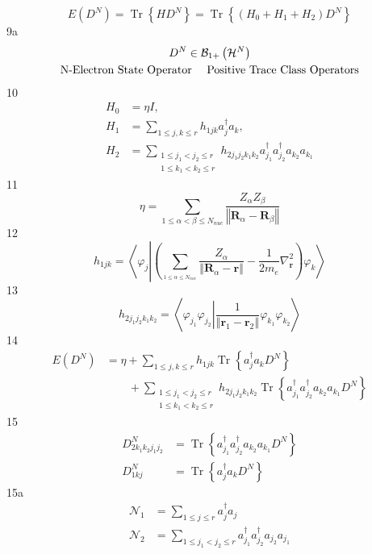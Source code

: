 \documentclass[aps,preprint]{revtex4}%
\begin{document}
\[
E\left(  D^{N}\right)  =\operatorname{Tr}\left\{  HD^{N}\right\}
=\operatorname{Tr}\left\{  \left(  H_{0}+H_{1}+H_{2}\right)  D^{N}\right\}
\]
9a%
\begin{gather*}
D^{N}\in\mathcal{B}_{1+}\left(  \mathcal{H}^{N}\right) \\
\text{N-Electron State Operator \quad Positive Trace Class Operators}%
\end{gather*}
10%
\begin{align*}
H_{0}  &  =\eta I,\\
H_{1}  &  =\sum_{1\leq j,k\leq r}h_{1jk}a_{j}^{\dagger}a_{k},\\
H_{2}  &  =\sum_{\substack{1\leq j_{1}<j_{2}\leq r\\1\leq k_{1}<k_{2}\leq
r}}h_{2j_{1}j_{2}k_{1}k_{2}}a_{j_{1}}^{\dagger}a_{j_{2}}^{\dagger}a_{k_{2}%
}a_{k_{1}}%
\end{align*}
11%
\[
\eta=\sum_{1\leq\alpha<\beta\leq N_{nuc}}\frac{Z_{\alpha}Z_{\beta}}{\left\Vert
\mathbf{R}_{\alpha}-\mathbf{R}_{\beta}\right\Vert }%
\]
12%
\[
h_{1jk}=\left\langle \varphi_{j}\left\vert \left(  \sum_{_{1\leq\alpha\leq
N_{nuc}}}\frac{Z_{\alpha}}{\left\Vert \mathbf{R}_{\alpha}-\mathbf{r}%
\right\Vert }-\frac{1}{2m_{e}}\nabla_{\mathbf{r}}^{2}\right)  \right.
\varphi_{k}\right\rangle
\]
13%
\[
h_{2j_{1}j_{2}k_{1}k_{2}}=\left\langle \varphi_{j_{1}}\varphi_{j_{2}%
}\left\vert \frac{1}{\left\Vert \mathbf{r}_{1}-\mathbf{r}_{2}\right\Vert
}\right.  \varphi_{k_{1}}\varphi_{k_{2}}\right\rangle
\]
14%
\begin{align*}
E\left(  D^{N}\right)   &  =\eta+\sum_{1\leq j,k\leq r}h_{1jk}%
\operatorname{Tr}\left\{  a_{j}^{\dagger}a_{k}D^{N}\right\} \\
&  \qquad+\sum_{\substack{1\leq j_{1}<j_{2}\leq r\\1\leq k_{1}<k_{2}\leq
r}}h_{2j_{1}j_{2}k_{1}k_{2}}\operatorname{Tr}\left\{  a_{j_{1}}^{\dagger
}a_{j_{2}}^{\dagger}a_{k_{2}}a_{k_{1}}D^{N}\right\}
\end{align*}
15%
\begin{align*}
D_{2k_{1}k_{2}j_{1}j_{2}}^{N}  &  =\operatorname{Tr}\left\{  a_{j_{1}%
}^{\dagger}a_{j_{2}}^{\dagger}a_{k_{2}}a_{k_{1}}D^{N}\right\} \\
D_{1kj}^{N}  &  =\operatorname{Tr}\left\{  a_{j}^{\dagger}a_{k}D^{N}\right\}
\end{align*}
15a%
\begin{align*}
\mathcal{N}_{1}  &  =\sum_{1\leq j\leq r}a_{j}^{\dagger}a_{j}\\
\mathcal{N}_{2}  &  =\sum_{1\leq j_{1}<j_{2}\leq r}a_{j_{1}}^{\dagger}%
a_{j_{2}}^{\dagger}a_{j_{2}}a_{j_{1}}%
\end{align*}
\end{document}
